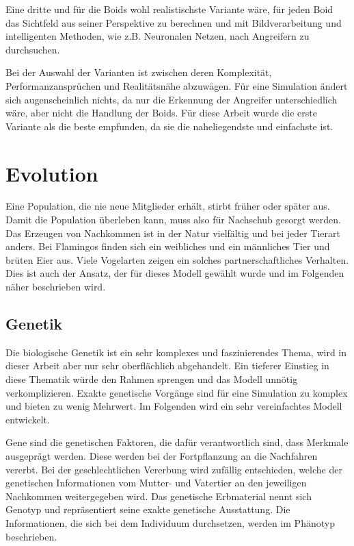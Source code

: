 \documentclass[draft=false
              ,paper=a4
              ,twoside=false
              ,fontsize=11pt
              ,headsepline
              ,BCOR10mm
              ,DIV11
              ,bibtotoc
              ,liststotoc
              ]{scrbook}
\begin{document}
Eine dritte und für die Boids wohl realistischste Variante wäre, für jeden Boid das Sichtfeld aus seiner Perspektive zu berechnen und mit Bildverarbeitung und intelligenten Methoden, wie z.B. Neuronalen Netzen, nach Angreifern zu durchsuchen.

Bei der Auswahl der Varianten ist zwischen deren Komplexität, Performanzansprüchen und Realitätsnähe abzuwägen. Für eine Simulation ändert sich augenscheinlich nichts, da nur die Erkennung der Angreifer unterschiedlich wäre, aber nicht die Handlung der Boids. Für diese Arbeit wurde die erste Variante als die beste empfunden, da sie die naheliegendste und einfachste ist.

\section{Evolution}
Eine Population, die nie neue Mitglieder erhält, stirbt früher oder später aus. Damit die Population überleben kann, muss also für Nachschub gesorgt werden. Das Erzeugen von Nachkommen ist in der Natur vielfältig und bei jeder Tierart anders. Bei Flamingos finden sich ein weibliches und ein männliches Tier und brüten Eier aus. Viele Vogelarten zeigen ein solches partnerschaftliches Verhalten. Dies ist auch der Ansatz, der für dieses Modell gewählt wurde und im Folgenden näher beschrieben wird.

\subsection{Genetik}
Die biologische Genetik ist ein sehr komplexes und faszinierendes Thema, wird in dieser Arbeit aber nur sehr oberflächlich abgehandelt. Ein tieferer Einstieg in diese Thematik würde den Rahmen sprengen und das Modell unnötig verkomplizieren. Exakte genetische Vorgänge sind für eine Simulation zu komplex und bieten zu wenig Mehrwert. Im Folgenden wird ein sehr vereinfachtes Modell entwickelt.

Gene sind die genetischen Faktoren, die dafür verantwortlich sind, dass Merkmale ausgeprägt werden. Diese werden bei der Fortpflanzung an die Nachfahren vererbt. Bei der geschlechtlichen Vererbung wird zufällig entschieden, welche der genetischen Informationen vom Mutter- und Vatertier an den jeweiligen Nachkommen weitergegeben wird. Das genetische Erbmaterial nennt sich Genotyp und repräsentiert seine exakte genetische Ausstattung. Die Informationen, die sich bei dem Individuum durchsetzen, werden im Phänotyp beschrieben.
\end{document}
